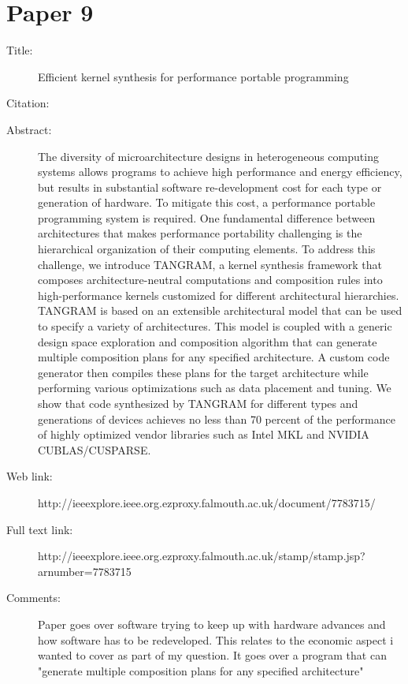 \documentclass{scrartcl}
\begin{document}
\section*{Paper 9}
\begin{description}
\item[Title:] Efficient kernel synthesis for performance portable programming
\item[Citation:] \cite{OptimisationChang}
\item[Abstract:] The diversity of microarchitecture designs in heterogeneous computing systems allows programs to achieve high performance and energy efficiency, but results in substantial software re-development cost for each type or generation of hardware. To mitigate this cost, a performance portable programming system is required. One fundamental difference between architectures that makes performance portability challenging is the hierarchical organization of their computing elements. To address this challenge, we introduce TANGRAM, a kernel synthesis framework that composes architecture-neutral computations and composition rules into high-performance kernels customized for different architectural hierarchies. TANGRAM is based on an extensible architectural model that can be used to specify a variety of architectures. This model is coupled with a generic design space exploration and composition algorithm that can generate multiple composition plans for any specified architecture. A custom code generator then compiles these plans for the target architecture while performing various optimizations such as data placement and tuning. We show that code synthesized by TANGRAM for different types and generations of devices achieves no less than 70 percent of the performance of highly optimized vendor libraries such as Intel MKL and NVIDIA CUBLAS/CUSPARSE.
\item[Web link:] http://ieeexplore.ieee.org.ezproxy.falmouth.ac.uk/document/7783715/
\item[Full text link:] http://ieeexplore.ieee.org.ezproxy.falmouth.ac.uk/stamp/stamp.jsp?arnumber=7783715
\item[Comments:] 
Paper goes over software trying to keep up with hardware advances and how software has to be redeveloped. This relates to the economic aspect i wanted to cover as part of my question. 
It goes over a program that can "generate multiple composition plans for any specified architecture"
\end{description}
\end{document}
